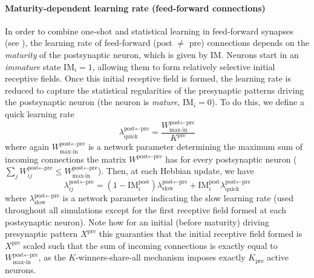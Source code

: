 \documentclass{article}
\begin{document}
\paragraph*{Maturity-dependent learning rate (feed-forward connections)}
In order to combine one-shot and statistical learning in feed-forward synapses (see ), the learning rate of feed-forward (post $\neq$ pre) connections depends on the \textit{maturity} of the postsynaptic neuron, which is given by $\textrm{IM}$. Neurons start in an \textit{immature} state $\textrm{IM}_i = 1$, allowing them to form relatively selective initial receptive fields. Once this initial receptive field is formed, the learning rate is reduced to capture the statistical regularities of the presynaptic patterns driving the postsynaptic neuron (the neuron is \textit{mature}, $\textrm{IM}_i = 0$). To do this, we define a quick learning rate
\begin{equation}
        \lambda^{\textrm{post}\leftarrow\textrm{pre}}_\textrm{quick} = \frac{W^{\textrm{post}\leftarrow\textrm{pre}}_\textrm{max-in}}{K^\textrm{pre}} 
\end{equation}
where again $W^{\textrm{post}\leftarrow\textrm{pre}}_\textrm{max-in}$ is a network parameter determining the maximum sum of incoming connections the matrix $W^{\textrm{post}\leftarrow\textrm{pre}}$ has for every postsynaptic neuron ($\sum_jW^{\textrm{post}\leftarrow\textrm{pre}}_{ij} \leq W^{\textrm{post}\leftarrow\textrm{pre}}_\textrm{max-in}$). Then, at each Hebbian update, we have
\begin{equation}
    \lambda_{ij}^{\textrm{post} \leftarrow \textrm{pre}} = (1 - \textrm{IM}^\textrm{post}_i)\lambda^{\textrm{post} \leftarrow \textrm{pre}}_\textrm{slow} + \textrm{IM}^\textrm{post}_i\lambda^{\textrm{post}\leftarrow\textrm{pre}}_\textrm{quick}
\end{equation}
where $\lambda^{\textrm{post} \leftarrow \textrm{pre}}_\textrm{slow}$ is a network parameter indicating the slow learning rate (used throughout all simulations except for the first receptive field formed at each postsynaptic neuron). Note how for an initial (before maturity) driving presynaptic pattern $X^\textrm{pre}$ this guaranties that the initial receptive field formed is $X^\textrm{pre}$ scaled such that the sum of incoming connections is exactly equal to $W^{\textrm{post}\leftarrow\textrm{pre}}_\textrm{max-in}$, as the $K$-winners-share-all mechanism imposes exactly $K_\textrm{pre}$ active neurons. 
\end{document}
